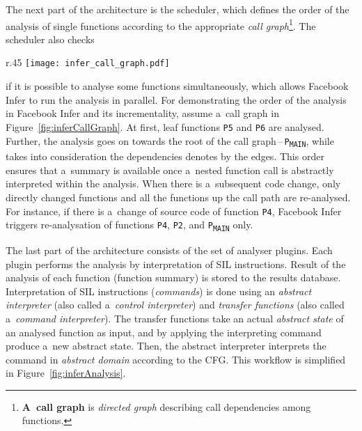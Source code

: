 The next part of the architecture is the scheduler, which defines the
order of the analysis of single functions according to the appropriate
\emph{call graph}\footnote{\textbf{A~call graph} is \emph{directed graph}
describing call dependencies among functions.}. The scheduler also checks
\begin{wrapfigure}{r}{.45 \linewidth}
    \centering
    \vspace{-.5em}
    \texttt{[image: infer\_call\_graph.pdf]}
    \caption{
        A~call graph for an illustration of Facebook Infer's
        analysis process~\cite{inferAISlides}, \cite{excel2019FBInfer},
        \cite{projectPracticeMarcin2018}
    }
    \label{fig:inferCallGraph}
\end{wrapfigure}
if it is possible to analyse some functions simultaneously, which allows
Facebook Infer to run the analysis in parallel. For demonstrating the order
of the analysis in Facebook Infer and its incrementality, assume a~call
graph in Figure~\ref{fig:inferCallGraph}. At first, leaf functions
\texttt{P5} and \texttt{P6} are analysed. Further, the analysis goes on
towards the root of the call graph\,--\,\texttt{P\textsubscript{MAIN}},
while takes into consideration the dependencies denotes by the edges. This
order ensures that a~summary is available once a~nested function call is
abstractly interpreted within the analysis. When there is a~subsequent code
change, only directly changed functions and all the functions up the call
path are re-analysed. For instance, if there is a~change of source code of
function \texttt{P4}, Facebook Infer triggers re-analysation of functions
\texttt{P4}, \texttt{P2}, and \texttt{P\textsubscript{MAIN}} only.

The last part of the architecture consists of the set of analyser plugins.
Each plugin performs the analysis by interpretation of SIL instructions.
Result of the analysis of each function (function summary) is stored to
the results database. Interpretation of SIL instructions (\emph{commands})
is done using an \emph{abstract interpreter} (also called a~\emph{control
interpreter}) and \emph{transfer functions} (also called a~\emph{command
interpreter}). The transfer functions take an actual \emph{abstract state}
of an analysed function as input, and by applying the interpreting command
produce a~new abstract state. Then, the abstract interpreter interprets the
command in \emph{abstract domain} according to the CFG. This workflow is
simplified in Figure~\ref{fig:inferAnalysis}.

